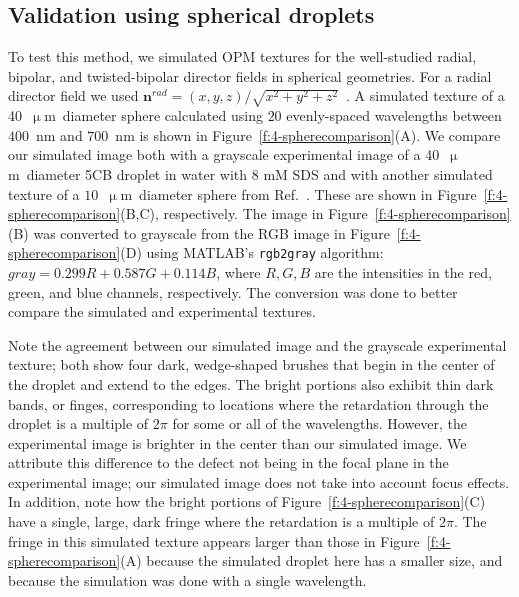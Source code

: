 \subsection{Validation using spherical droplets}
To test this method, we simulated OPM textures for the well-studied radial, bipolar, and twisted-bipolar director fields in spherical geometries.
For a radial director field we used $\mathbf{n}^{rad} = (x,y,z)/\sqrt{x^2+y^2+z^2}$~\cite{RN232}.
A simulated texture of a 40~$\upmu$m~diameter sphere calculated using $20$ evenly-spaced wavelengths between $400$~nm and $700$~nm is shown in Figure~\ref{f:4-spherecomparison}(A).
We compare our simulated image both with a grayscale experimental image of a 40~$\upmu$m~diameter 5CB droplet in water with 8 mM SDS and with another simulated texture of a $10$~$\upmu$m~diameter sphere from Ref.~\cite{RN310}.
These are shown in Figure~\ref{f:4-spherecomparison}(B,C), respectively.
The image in Figure~\ref{f:4-spherecomparison}(B) was converted to grayscale from the RGB image in Figure~\ref{f:4-spherecomparison}(D) using MATLAB's \texttt{rgb2gray} algorithm: $\mathit{gray} = 0.299 R + 0.587 G + 0.114 B$, where $R,G,B$ are the intensities in the red, green, and blue channels, respectively.
The conversion was done to better compare the simulated and experimental textures.

Note the agreement between our simulated image and the grayscale experimental texture; both show four dark, wedge-shaped brushes that begin in the center of the droplet and extend to the edges.
The bright portions also exhibit thin dark bands, or finges, corresponding to locations where the retardation through the droplet is a multiple of $2 \pi$ for some or all of the wavelengths.
However, the experimental image is brighter in the center than our simulated image.
We attribute this difference to the defect not being in the focal plane in the experimental image; our simulated image does not take into account focus effects.
In addition, note how the bright portions of Figure~\ref{f:4-spherecomparison}(C) have a single, large, dark fringe where the retardation is a multiple of $2 \pi$.
The fringe in this simulated texture appears larger than those in Figure~\ref{f:4-spherecomparison}(A) because the simulated droplet here has a smaller size, and because the simulation was done with a single wavelength.

